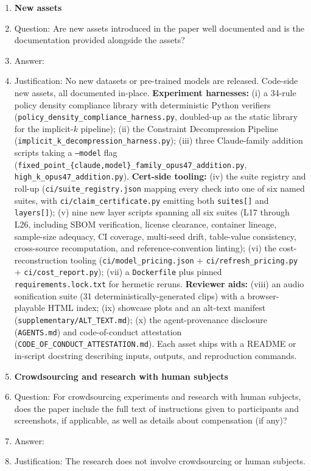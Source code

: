 \begin{enumerate}
\item {\bf New assets}
    \item[] Question: Are new assets introduced in the paper well documented and is the documentation provided alongside the assets?
    \item[] Answer: \answerYes{}
    \item[] Justification: No new datasets or pre-trained models are released. Code-side new assets, all documented in-place. \textbf{Experiment harnesses:} (i) a 34-rule policy density compliance library with deterministic Python verifiers (\texttt{policy\_density\_compliance\_harness.py}, doubled-up as the static library for the implicit-$k$ pipeline); (ii) the Constraint Decompression Pipeline (\texttt{implicit\_k\_decompression\_harness.py}); (iii) three Claude-family addition scripts taking a \texttt{--model} flag (\texttt{fixed\_point\_\{claude,model\}\_family\_opus47\_addition.py}, \texttt{high\_k\_opus47\_addition.py}). \textbf{Cert-side tooling:} (iv) the suite registry and roll-up (\texttt{ci/suite\_registry.json} mapping every check into one of six named suites, with \texttt{ci/claim\_certificate.py} emitting both \texttt{suites[]} and \texttt{layers[]}); (v) nine new layer scripts spanning all six suites (L17 through L26, including SBOM verification, license clearance, container lineage, sample-size adequacy, CI coverage, multi-seed drift, table-value consistency, cross-source recomputation, and reference-convention linting); (vi) the cost-reconstruction tooling (\texttt{ci/model\_pricing.json} + \texttt{ci/refresh\_pricing.py} + \texttt{ci/cost\_report.py}); (vii) a \texttt{Dockerfile} plus pinned \texttt{requirements.lock.txt} for hermetic reruns. \textbf{Reviewer aids:} (viii) an audio sonification suite (31 deterministically-generated clips) with a browser-playable HTML index; (ix) showcase plots and an alt-text manifest (\texttt{supplementary/ALT\_TEXT.md}); (x) the agent-provenance disclosure (\texttt{AGENTS.md}) and code-of-conduct attestation (\texttt{CODE\_OF\_CONDUCT\_ATTESTATION.md}). Each asset ships with a README or in-script docstring describing inputs, outputs, and reproduction commands.

\item {\bf Crowdsourcing and research with human subjects}
    \item[] Question: For crowdsourcing experiments and research with human subjects, does the paper include the full text of instructions given to participants and screenshots, if applicable, as well as details about compensation (if any)?
    \item[] Answer: \answerNA{}
    \item[] Justification: The research does not involve crowdsourcing or human subjects.


\end{enumerate}
